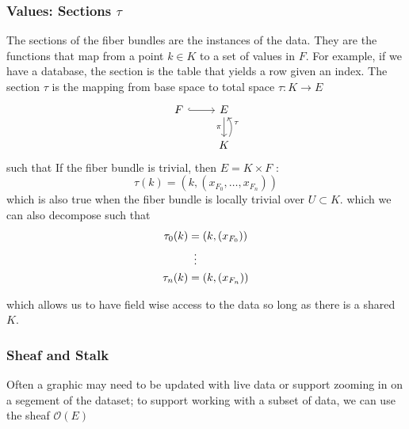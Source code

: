 \documentclass[../main.tex]{subfiles}
\begin{document}
\subsubsection{Values: Sections $\tau$}
\label{sec:data_section}
\label{sec:section_data}
The sections of the fiber bundles are the instances of the data. They are the functions that map from a point $k \in K$ to a set of values in $F$. For example, if we have a database, the section is the table that yields a row given an index. The section $\tau$ is the mapping from base space to total space $\tau: K\rightarrow E$ 
\begin{equation}
    \label{eq:section}
    \begin{tikzcd}
        F \arrow[r, hook] & E \arrow[d, "\pi"']           \\
        & K \arrow[u, "\tau"', bend right]
    \end{tikzcd}
\end{equation}
such that %
If the fiber bundle is trivial, then $E = K \times F$ \cite{rowlandFiberBundle,FiberBundle2020}:
\begin{equation}
    \label{eq:section_return}
    \tau(k) = (k, (x_{F_{0}}, \ldots, x_{F_{n}}))
\end{equation}
which is also true when the fiber bundle is locally trivial over $U \subset K$.
which we can also decompose such that
\begin{align}
\tau_{0}(k) &= (k, (x_{F_{0}}))\\
            & \vdotswithin{=}\\
\tau_{n}(k) &= (k, (x_{F_{n}}))
\end{align}

which allows us to have field wise access to the data so long as there is a shared $K$.  


\subsubsection{Sheaf and Stalk}
\label{sec:data_sheaf_stalk}
Often a graphic may need to be updated with live data or support zooming in on a segement of the dataset; to support working with a subset of data, we can use the sheaf $\mathcal{O}(E)$
\end{document}
